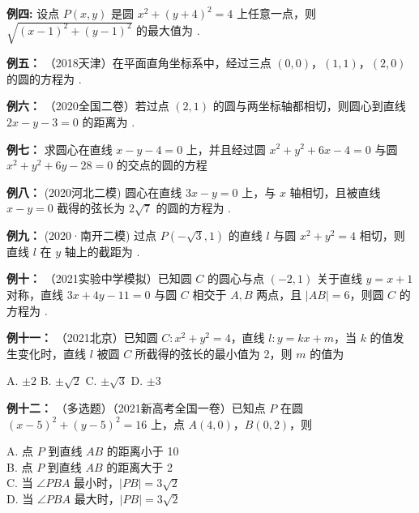 \documentclass{article}
\begin{document}
\noindent
\textbf{例四: } 设点 \(P(x,y)\) 是圆 \(x^2 + (y+4)^2 = 4\) 上任意一点，则 \(\sqrt{(x-1)^2 + (y-1)^2}\) 的最大值为 \underline{\qquad}.
\vspace{2\baselineskip}

\noindent
\textbf{例五： }（2018天津）在平面直角坐标系中，经过三点 \((0,0)\)，\((1,1)\)，\((2,0)\) 的圆的方程为 \underline{\qquad\qquad\qquad}.
\vspace{2\baselineskip}

\noindent
\textbf{例六： }（2020全国二卷）若过点 \((2,1)\) 的圆与两坐标轴都相切，则圆心到直线 \(2x - y - 3 = 0\) 的距离为 \underline{\qquad}.
\vspace{2\baselineskip}

\noindent\textbf{例七： }求圆心在直线 \(x - y - 4 = 0\) 上，并且经过圆 \(x^2 + y^2 + 6x - 4 = 0\) 与圆 \(x^2 + y^2 + 6y - 28 = 0\) 的交点的圆的方程
\vspace{2\baselineskip}

\noindent\textbf{例八： }(2020河北二模) 圆心在直线 \(3x - y = 0\) 上，与 \(x\) 轴相切，且被直线 \(x - y = 0\) 截得的弦长为 \(2\sqrt{7}\) 的圆的方程为 \underline{\qquad\qquad\qquad}.
\vspace{2\baselineskip}

\noindent\textbf{例九： }(2020·南开二模) 过点 \(P(-\sqrt{3},1)\) 的直线 \(l\) 与圆 \(x^2 + y^2 = 4\) 相切，则直线 \(l\) 在 \(y\) 轴上的截距为 \underline{\qquad}.
\vspace{2\baselineskip}

\noindent\textbf{例十： }（2021实验中学模拟）已知圆 \(C\) 的圆心与点 \((-2,1)\) 关于直线 \(y = x + 1\) 对称，直线 \(3x + 4y - 11 = 0\) 与圆 \(C\) 相交于 \(A,B\) 两点，且 \(|AB| = 6\)，则圆 \(C\) 的方程为 \underline{\qquad\qquad\qquad}.
\vspace{2\baselineskip}

\noindent
\textbf{例十一： }（2021北京）已知圆 \(C: x^2 + y^2 = 4\)，直线 \(l: y = kx + m\)，当 \(k\) 的值发生变化时，直线 \(l\) 被圆 \(C\) 所截得的弦长的最小值为 2，则 \(m\) 的值为 

\vspace{0.5em}
\noindent
A. \(\pm 2\) \quad
B. \(\pm \sqrt{2}\) \quad
C. \(\pm \sqrt{3}\) \quad
D. \(\pm 3\)
\vspace{2\baselineskip}

\noindent
\textbf{例十二： }（多选题）（2021新高考全国一卷）已知点 \(P\) 在圆 \((x-5)^2 + (y-5)^2 = 16\) 上，点 \(A(4,0)\)，\(B(0,2)\)，则

\vspace{0.5em}
\noindent
A. 点 \(P\) 到直线 \(AB\) 的距离小于 10 \\
B. 点 \(P\) 到直线 \(AB\) 的距离大于 2 \\
C. 当 \(\angle PBA\) 最小时，\(|PB| = 3\sqrt{2}\) \\
D. 当 \(\angle PBA\) 最大时，\(|PB| = 3\sqrt{2}\)
\vspace{2\baselineskip}
\end{document}
